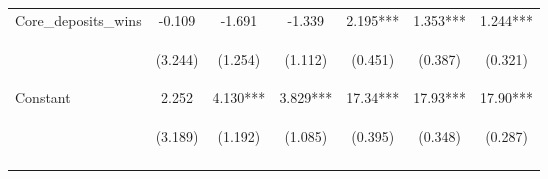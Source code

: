 \documentclass[]{article}
\begin{document}
\begin{center}
\begin{tabular}{lcccccc}
Core\_deposits\_wins & -0.109 & -1.691 & -1.339 & 2.195*** & 1.353*** & 1.244*** \\
\vspace{4pt} & \begin{footnotesize}(3.244)\end{footnotesize} & \begin{footnotesize}(1.254)\end{footnotesize} & \begin{footnotesize}(1.112)\end{footnotesize} & \begin{footnotesize}(0.451)\end{footnotesize} & \begin{footnotesize}(0.387)\end{footnotesize} & \begin{footnotesize}(0.321)\end{footnotesize} \\
Constant & 2.252 & 4.130*** & 3.829*** & 17.34*** & 17.93*** & 17.90*** \\
 & \begin{footnotesize}(3.189)\end{footnotesize} & \begin{footnotesize}(1.192)\end{footnotesize} & \begin{footnotesize}(1.085)\end{footnotesize} & \begin{footnotesize}(0.395)\end{footnotesize} & \begin{footnotesize}(0.348)\end{footnotesize} & \begin{footnotesize}(0.287)\end{footnotesize} \\
\vspace{4pt} & \begin{footnotesize}\end{footnotesize} & \begin{footnotesize}\end{footnotesize} & \begin{footnotesize}\end{footnotesize} & \begin{footnotesize}\end{footnotesize} & \begin{footnotesize}\end{footnotesize} & \begin{footnotesize}\end{footnotesize} \\

\end{tabular}
\end{center}
\end{document}
